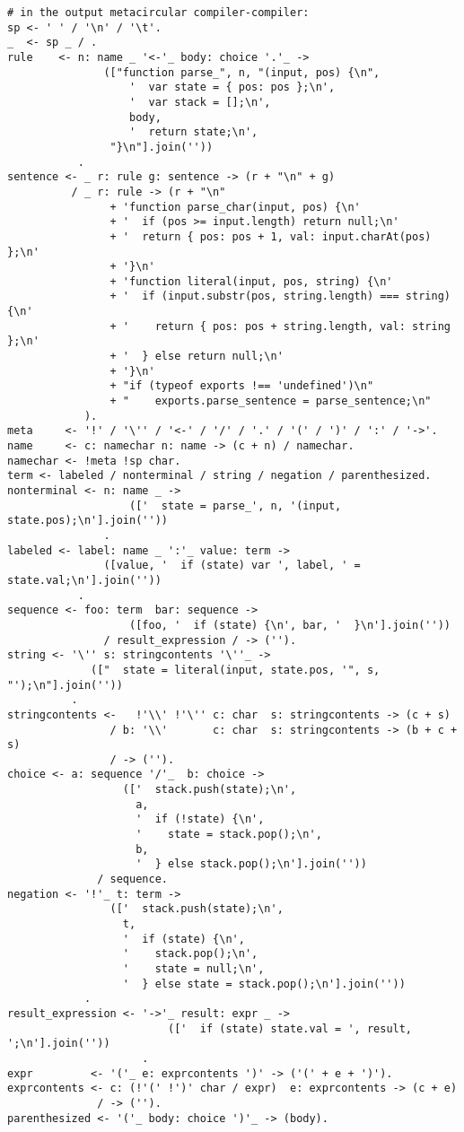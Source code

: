 \documentclass[
]{article}
\begin{document}
\begin{verbatim}
# in the output metacircular compiler-compiler:
sp <- ' ' / '\n' / '\t'.
_  <- sp _ / .
rule    <- n: name _ '<-'_ body: choice '.'_ ->
               (["function parse_", n, "(input, pos) {\n",
                   '  var state = { pos: pos };\n',
                   '  var stack = [];\n',
                   body, 
                   '  return state;\n',
                "}\n"].join(''))
           .
sentence <- _ r: rule g: sentence -> (r + "\n" + g)
          / _ r: rule -> (r + "\n"
                + 'function parse_char(input, pos) {\n'
                + '  if (pos >= input.length) return null;\n'
                + '  return { pos: pos + 1, val: input.charAt(pos) };\n'
                + '}\n'
                + 'function literal(input, pos, string) {\n'
                + '  if (input.substr(pos, string.length) === string) {\n'
                + '    return { pos: pos + string.length, val: string };\n'
                + '  } else return null;\n'
                + '}\n'
                + "if (typeof exports !== 'undefined')\n"
                + "    exports.parse_sentence = parse_sentence;\n"
            ).
meta     <- '!' / '\'' / '<-' / '/' / '.' / '(' / ')' / ':' / '->'.
name     <- c: namechar n: name -> (c + n) / namechar.
namechar <- !meta !sp char.
term <- labeled / nonterminal / string / negation / parenthesized.
nonterminal <- n: name _ ->
                   (['  state = parse_', n, '(input, state.pos);\n'].join(''))
               .
labeled <- label: name _ ':'_ value: term ->
               ([value, '  if (state) var ', label, ' = state.val;\n'].join(''))
           .
sequence <- foo: term  bar: sequence -> 
                   ([foo, '  if (state) {\n', bar, '  }\n'].join(''))
               / result_expression / -> ('').
string <- '\'' s: stringcontents '\''_ ->
             (["  state = literal(input, state.pos, '", s, "');\n"].join(''))
          .
stringcontents <-   !'\\' !'\'' c: char  s: stringcontents -> (c + s)
                / b: '\\'       c: char  s: stringcontents -> (b + c + s)
                / -> ('').
choice <- a: sequence '/'_  b: choice ->
                  (['  stack.push(state);\n',
                    a,
                    '  if (!state) {\n',
                    '    state = stack.pop();\n',
                    b,
                    '  } else stack.pop();\n'].join(''))
              / sequence.
negation <- '!'_ t: term ->
                (['  stack.push(state);\n',
                  t,
                  '  if (state) {\n',
                  '    stack.pop();\n',
                  '    state = null;\n',
                  '  } else state = stack.pop();\n'].join(''))
            .
result_expression <- '->'_ result: expr _ ->
                         (['  if (state) state.val = ', result, ';\n'].join(''))
                     .
expr         <- '('_ e: exprcontents ')' -> ('(' + e + ')').
exprcontents <- c: (!'(' !')' char / expr)  e: exprcontents -> (c + e)
              / -> ('').
parenthesized <- '('_ body: choice ')'_ -> (body).
\end{verbatim}
\end{document}
